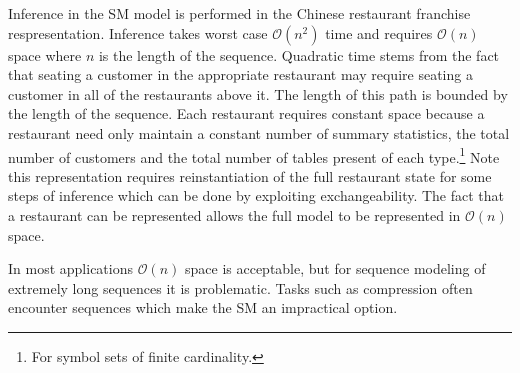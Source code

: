 Inference in the SM model is performed in the Chinese restaurant franchise respresentation. Inference takes worst case $\mathcal{O}(n^2)$ time and requires $\mathcal{O}(n)$ space where $n$ is the length of the sequence. Quadratic time stems from the fact that seating a customer in the appropriate restaurant may require seating a customer in all of the restaurants above it.  The length of this path is bounded by the length of the sequence. Each restaurant requires constant space because a restaurant need only maintain a constant number of summary statistics, the total number of customers and the total number of tables present of each type.\footnote{For symbol sets of finite cardinality.} Note this representation requires reinstantiation of the full restaurant state for some steps of inference which can be done by exploiting exchangeability.  The fact that a restaurant can be represented allows the full model to be represented in $\mathcal{O}(n)$ space.

In most applications $\mathcal{O}(n)$ space is acceptable, but for sequence modeling of extremely long sequences it is problematic.  Tasks such as compression often encounter sequences which make the SM an impractical option.  